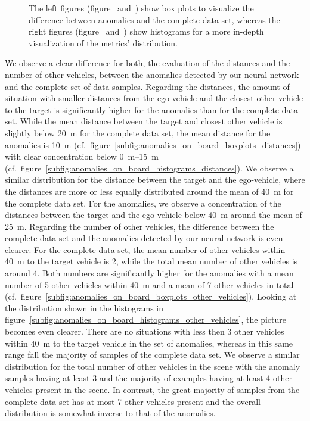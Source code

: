 \begin{figure}[t]
{    The left figures (figure~\protect{} and~\protect{}) show box plots to visualize the difference between anomalies and the complete data set, whereas the right figures (figure~\protect{} and~\protect{}) show histograms for a more in-depth visualization of the metrics' distribution.}
    \label{fig:anomaly_ngsim}
\end{figure}

We observe a clear difference for both, the evaluation of the distances and the number of other vehicles, between the anomalies detected by our neural network and the complete set of data samples.
Regarding the distances, the amount of situation with smaller distances from the ego-vehicle and the closest other vehicle to the target is significantly higher for the anomalies than for the complete data set.
While the mean distance between the target and closest other vehicle is slightly below \SI{20}{\meter} for the complete data set, the mean distance for the anomalies is \SI{10}{\meter} (cf.\ figure~\ref{subfig:anomalies_on_board_boxplots_distances}) with clear concentration below \SIrange{0}{15}{\meter} (cf.\ figure~\ref{subfig:anomalies_on_board_histograms_distances}).
We observe a similar distribution for the distance between the target and the ego-vehicle, where the distances are more or less equally distributed around the mean of \SI{40}{\meter} for the complete data set.
For the anomalies, we observe a concentration of the distances between the target and the ego-vehicle below \SI{40}{\meter} around the mean of \SI{25}{\meter}.
Regarding the number of other vehicles, the difference between the complete data set and the anomalies detected by our neural network is even clearer.
For the complete data set, the mean number of other vehicles within \SI{40}{\meter} to the target vehicle is \num{2}, while the total mean number of other vehicles is around \num{4}.
Both numbers are significantly higher for the anomalies with a mean number of \num{5} other vehicles within \SI{40}{\meter} and a mean of \num{7} other vehicles in total (cf.\ figure~\ref{subfig:anomalies_on_board_boxplots_other_vehicles}).
Looking at the distribution shown in the histograms in figure~\ref{subfig:anomalies_on_board_histograms_other_vehicles}, the picture becomes even clearer. 
There are no situations with less then \num{3} other vehicles within \SI{40}{\meter} to the target vehicle in the set of anomalies, whereas in this same range fall the majority of samples of the complete data set.
We observe a similar distribution for the total number of other vehicles in the scene with the anomaly samples having at least \num{3} and the majority of examples having at least \num{4} other vehicles present in the scene.
In contrast, the great majority of samples from the complete data set has at most \num{7} other vehicles present and the overall distribution is somewhat inverse to that of the anomalies.


